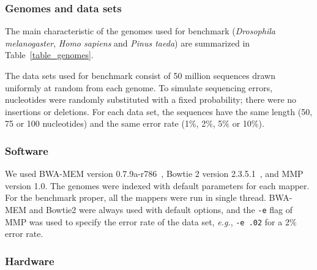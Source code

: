 \documentclass[a4,center,fleqn]{NAR}
\begin{document}
\subsubsection{Genomes and data sets}

The main characteristic of the genomes used for benchmark
(\textit{Drosophila melanogaster}, \textit{Homo sapiens} and \textit{Pinus
taeda}) are summarized in Table~\ref{table_genomes}.

\begin{table}[b]
{}
\end{table}

The data sets used for benchmark consist of 50 million sequences drawn
uniformly at random from each genome. To simulate sequencing errors,
nucleotides were randomly substituted with a fixed probability; there were
no insertions or deletions. For each data set, the sequences have the same
length (50, 75 or 100 nucleotides) and the same error rate (1\%, 2\%, 5\%
or 10\%).

\subsubsection{Software}

We used BWA-MEM version 0.7.9a-r786~\cite{li2013aligning}, Bowtie 2
version 2.3.5.1~\cite{pmid22388286}, and MMP version 1.0. The genomes were
indexed with default parameters for each mapper. For the benchmark proper,
all the mappers were run in single thread. BWA-MEM and Bowtie2 were always
used with default options, and the \texttt{-e} flag of MMP was used to
specify the error rate of the data set, \textit{e.g.}, \texttt{-e .02} for
a 2\% error rate.

\subsubsection{Hardware}
\end{document}
